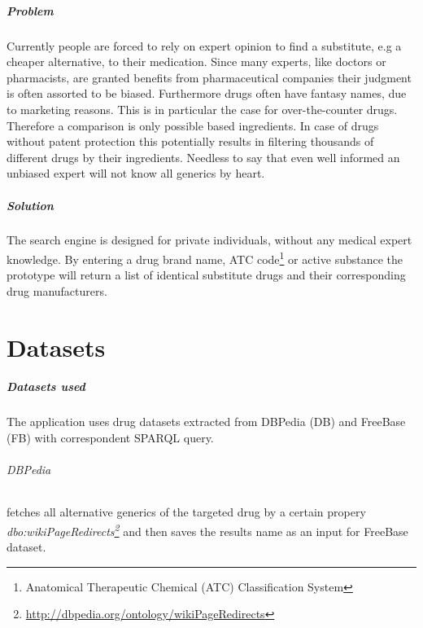 \documentclass[11pt,titlepage,oneside,openany]{book}
\begin{document}
\paragraph{Problem} \label{problem}
Currently people are forced to rely on expert opinion to find a substitute, e.g a cheaper alternative, to their medication. Since many experts, like doctors or pharmacists, are granted benefits from pharmaceutical companies their judgment is often assorted to be biased.
Furthermore drugs often have fantasy names, due to marketing reasons. This is in particular the case for over-the-counter drugs. Therefore a comparison is only possible based ingredients.
In case of drugs without patent protection this potentially results in filtering thousands of different drugs by their ingredients. Needless to say that even well informed an unbiased expert will not know all generics by heart.


\paragraph{Solution} 
The search engine is designed for private individuals, without any medical expert knowledge.
\label{solution} %
 By entering a drug brand name, ATC code\footnote{Anatomical Therapeutic Chemical (ATC) Classification System} or active substance the prototype will return a list of identical substitute drugs and their corresponding drug manufacturers.


\chapter{Datasets}
\label{cha:datasets}

\paragraph{Datasets used}
\label{datasets_used}
The application uses drug datasets extracted from DBPedia (DB) and FreeBase (FB) with correspondent SPARQL query.

\subparagraph{DBPedia}
\label{dbpedia}
fetches all alternative generics of the targeted drug by a certain propery \textit{ dbo:wikiPageRedirects\footnote{\url{http://dbpedia.org/ontology/wikiPageRedirects}}} and then saves the results name as an input for FreeBase dataset.
\end{document}
